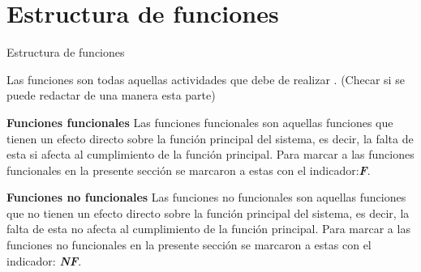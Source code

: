 \section{Estructura de funciones}
\label{Estructura_funciones}

Estructura de funciones
\par
Las funciones son todas aquellas actividades que debe de realizar .
\newline(Checar si se puede redactar de una manera esta parte)

\textbf{Funciones funcionales}\newline
Las funciones funcionales son aquellas funciones que tienen un efecto directo sobre la funci\'on principal del sistema, es decir, la falta de esta si afecta al cumplimiento de la funci\'on principal.\newline
Para marcar a las funciones funcionales en la presente secci\'on se marcaron a estas con el indicador:\hfill\textbf{\textit{F}}.

\textbf{Funciones no funcionales}\newline
Las funciones no funcionales son aquellas funciones que no tienen un efecto directo sobre la funci\'on principal del sistema, es decir, la falta de esta no afecta al cumplimiento de la funci\'on principal.\newline
Para marcar a las funciones no funcionales en la presente secci\'on se marcaron a estas con el indicador: \hfill\textbf{\textit{NF}}.
\\\\\\\\\\\\\\\\\\%


